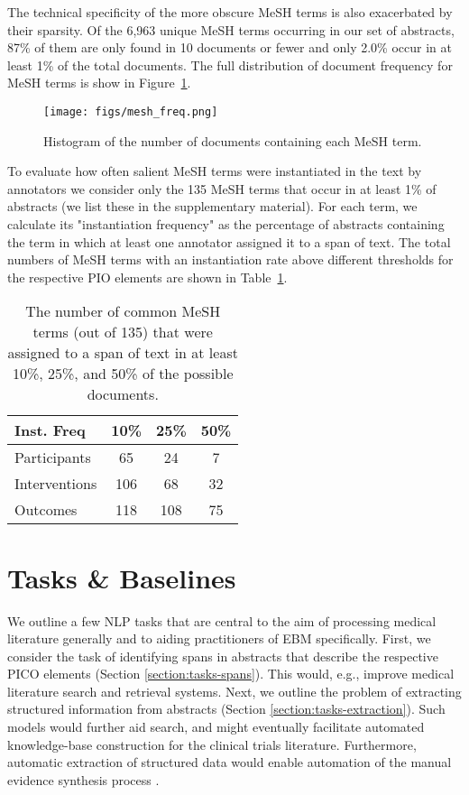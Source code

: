 \documentclass[11pt,a4paper]{article}
\begin{document}
The technical specificity of the more obscure MeSH terms is also exacerbated by their sparsity.
Of the 6,963 unique MeSH terms occurring in our set of abstracts, 87\% of them are only found in 10 documents or fewer and only 2.0\% occur in at least 1\% of the total documents.
The full distribution of document frequency for MeSH terms is show in Figure~\ref{fig:mesh_freq}.

\begin{figure}
\centering
\texttt{[image: figs/mesh\_freq.png]}
\caption{Histogram of the number of documents containing each MeSH term.}
\label{fig:mesh_freq}
\end{figure}

To evaluate how often salient MeSH terms were instantiated in the text by annotators we consider only the 135 MeSH terms that occur in at least 1\% of abstracts (we list these in the supplementary material).
For each term, we calculate its "instantiation frequency" as the percentage of abstracts containing the term in which at least one annotator assigned it to a span of text.
The total numbers of MeSH terms with an instantiation rate above different thresholds for the respective PIO elements are shown in Table~\ref{table:mesh_rates}.

\begin{table}\small \centering
    \begin{tabular}{ l c c c} 
    	\hline
        Inst. Freq & 10\% & 25\% & 50\% \\
        \hline
        Participants & 65 & 24 & 7 \\
        Interventions & 106 & 68 & 32 \\
        Outcomes & 118 & 108 & 75 \\
        \hline
    \end{tabular}
    \caption{The number of common MeSH terms (out of 135) that were assigned to a span of text in at least 10\%, 25\%, and 50\% of the possible documents. } \label{table:mesh_rates}
\end{table}

\section{Tasks \& Baselines}
\label{section:tasks-baselines}

We outline a few NLP tasks that are central to the aim of processing medical literature generally and to aiding practitioners of EBM specifically. First, we consider the task of identifying spans in abstracts that describe the respective PICO elements (Section \ref{section:tasks-spans}). This would, e.g., improve medical literature search and retrieval systems. Next, we outline the problem of extracting structured information from abstracts (Section \ref{section:tasks-extraction}). Such models would further aid search, and might eventually facilitate automated knowledge-base construction for the clinical trials literature. Furthermore, automatic extraction of structured data would enable automation of the manual evidence synthesis process \cite{marshall:2017:ACL}.
\end{document}
